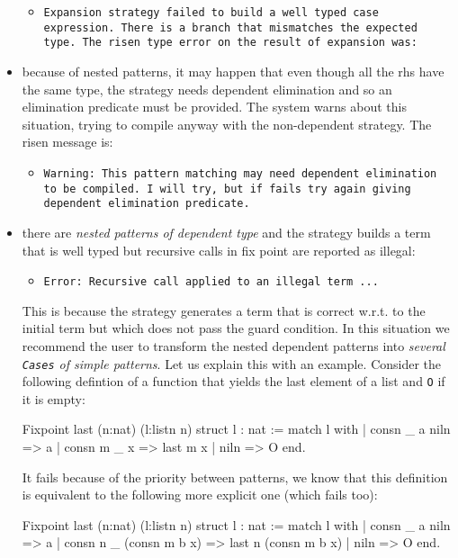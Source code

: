 \begin{itemize}
  \begin{itemize}
  \item 
  {\tt Expansion strategy failed to build a well typed case expression.
  There is a branch that mismatches the expected type.
  The risen type error on the result of expansion was:}
  \end{itemize}

\item because of nested patterns, it may happen that even  though all
the rhs have  the same type, the strategy needs
dependent elimination and so an elimination predicate must be
provided. The system
warns about this situation, trying to compile anyway with the
non-dependent strategy. The risen message is:
\begin{itemize}
\item {\tt Warning: This pattern matching may need dependent elimination to be compiled.
I will try, but if fails try again giving dependent elimination predicate.}
\end{itemize}

\item there are {\em nested patterns of dependent type} and the strategy
builds a term that is well typed but recursive
calls in fix point are reported as illegal:
\begin{itemize}
\item {\tt Error: Recursive call applied to an illegal term ...}
\end{itemize}

This is because the strategy generates a term that is correct
w.r.t. to the initial term but which does  not pass the guard condition.
In this situation we recommend the user to transform the nested  dependent
patterns into {\em several \verb+Cases+ of simple patterns}.
Let us explain this with an example.
Consider the following defintion of a function that yields the last
element of a list and \verb+O+ if it is empty:

\begin{coq_example}
Fixpoint last (n:nat) (l:listn n) {struct l} : nat :=
  match l with
  | consn _ a niln => a
  | consn m _ x => last m x
  | niln => O
  end.
\end{coq_example}

It fails because of the priority between patterns, we know that this
definition is equivalent to the following more explicit one (which
fails too):

\begin{coq_example*}
Fixpoint last (n:nat) (l:listn n) {struct l} : nat :=
  match l with
  | consn _ a niln => a
  | consn n _ (consn m b x) => last n (consn m b x)
  | niln => O
  end.
\end{coq_example*}


\end{itemize}
